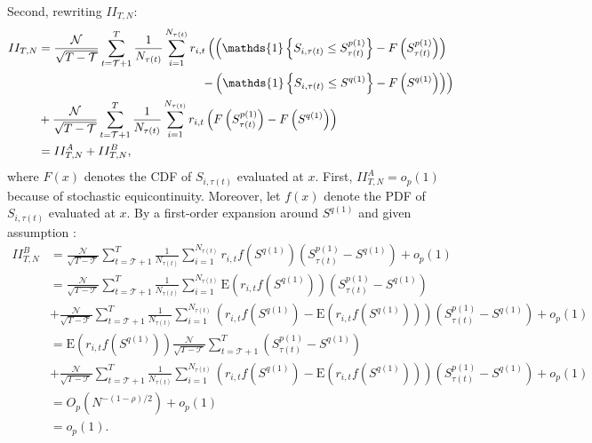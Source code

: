 Second, rewriting $II_{T,N}$: 
\begin{align*}
II_{T,N} &=\frac{\mathcal{N}}{\sqrt{T-\mathcal{T}}}\sum_{t=\mathcal{T}+1}^{T}\frac{1}{N_{\tau(t)}} \sum_{i=1}^{N_{\tau(t)}} r_{i,t} \left( \left( \mathds{1} \left\{ S_{i,\tau(t) }\leq S_{\tau(t) }^{p(1)}\right\} -F\left( S_{\tau(t) }^{p(1)}\right) \right) \right.\\
&\hspace{4.8cm} \left.- \left( \mathds{1} \left\{ S_{i,\tau(t) }\leq S^{q(1)}\right\} -F\left( S^{q(1)} \right) \right) \right) \\
&+ \frac{\mathcal{N}}{\sqrt{T-\mathcal{T}}}\sum_{t=\mathcal{T}+1}^{T}\frac{1}{N_{\tau(t)}} \sum_{i=1}^{N_{\tau(t)}}r_{i,t}\left( F\left( S_{\tau(t) }^{p(1)}\right) -F\left( S^{q(1)} \right) \right) \\
&= II_{T,N}^{A} + II_{T,N}^{B},
\end{align*}
where $F\left( x \right)$ denotes the CDF of $S_{i,\tau(t) }$ evaluated at $x$. First, $II_{T,N}^{A}=o_{p}(1)$ because of stochastic equicontinuity. Moreover, let $f(x)$ denote the PDF of $S_{i,\tau(t) }$ evaluated at $x$. By a first-order expansion around $S^{q(1)}$ and given assumption :
\begin{align*}
II_{T,N}^{B} &= \frac{\mathcal{N}}{\sqrt{T-\mathcal{T}}}\sum_{t=\mathcal{T}+1}^{T}\frac{1}{N_{\tau(t)}} \sum_{i=1}^{N_{\tau(t)}} r_{i,t}f\left( S^{q(1)} \right) \left( S_{\tau(t) }^{p(1)}-S^{q(1)} \right) + o_p(1) \\
&= \frac{\mathcal{N}}{\sqrt{T-\mathcal{T}}}\sum_{t=\mathcal{T}+1}^{T}\frac{1}{N_{\tau(t)}} \sum_{i=1}^{N_{\tau(t)}} \mathrm{E} \left( r_{i,t} f\left( S^{q(1)} \right) \right)  \left( S_{\tau(t) }^{p(1)}-S^{q(1)} \right) \\
&+ \frac{\mathcal{N}}{\sqrt{T-\mathcal{T}}}\sum_{t=\mathcal{T}+1}^{T}\frac{1}{N_{\tau(t)}} \sum_{i=1}^{N_{\tau(t)}} \left( r_{i,t} f\left( S^{q(1)} \right) - \mathrm{E} \left( r_{i,t} f\left( S^{q(1)} \right) \right) \right) \left( S_{\tau(t) }^{p(1)}-S^{q(1)} \right) + o_p(1) \\
&= \mathrm{E}\left( r_{i,t} f \left( S^{q(1)} \right) \right) \frac{\mathcal{N}}{\sqrt{T-\mathcal{T}}}\sum_{t=\mathcal{T}+1}^{T} \left( S_{\tau(t) }^{p(1)}-S^{q(1)} \right) \\
&+ \frac{\mathcal{N}}{\sqrt{T-\mathcal{T}}}\sum_{t=\mathcal{T}+1}^{T}\frac{1}{N_{\tau(t)}} \sum_{i=1}^{N_{\tau(t)}} \left( r_{i,t} f\left( S^{q(1)} \right) - \mathrm{E} \left( r_{i,t} f\left( S^{q(1)} \right) \right) \right) \left( S_{\tau(t) }^{p(1)}-S^{q(1)} \right) + o_p(1) \\
&= O_{p} \left( N^{-(1-\rho)/2} \right) + o_{p}(1) \\
&=o_{p}(1).
\end{align*} 

